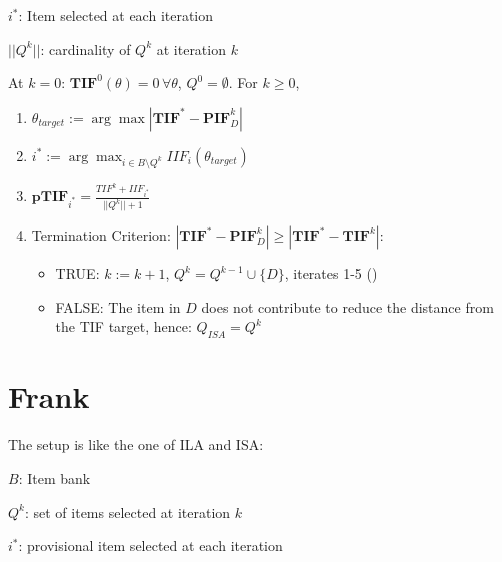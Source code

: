 \documentclass[12pt, a4paper, titilepage]{article}
\begin{document}
$i^*$: Item selected at each iteration


$||Q^k||$: cardinality of $Q^k$ at iteration $k$

\normalcolor

At $k = 0$: $\mathbf{TIF}^0(\theta) = 0 \, \forall \theta$, $Q^0 = \emptyset$. For $k \geq 0$,


\begin{enumerate}
	\item $\theta_{target} := \arg \max |\mathbf{TIF}^* - \mathbf{PIF}_D^{k}|$
	\item $i^* := \arg \max_{i \in B\setminus Q^k} IIF_i(\theta_{target})$
	\item $\mathbf{pTIF}_{i^*} = \frac{TIF^k + IIF_{i^*}}{||Q^{k}|| + 1}$
	\item Termination Criterion: $|\mathbf{TIF}^* - \mathbf{PIF}_D^k| \geq |\mathbf{TIF}^* - \mathbf{TIF}^{k}|$: 
	\begin{itemize}
		\item TRUE: $k := k +1$, $Q^{k} = Q^{k-1} \cup \{D\}$, iterates 1-5 ()
		\item FALSE: The item in $D$ does not contribute to reduce the distance from the TIF target, hence: $Q_{ISA} = Q^k$
	\end{itemize}
\end{enumerate}



\section{Frank}


The setup is like the one of ILA and ISA: 

$B$: Item bank 

$Q^k$: set of items selected at iteration $k$

$i^*$: provisional item selected at each iteration

\end{document}
